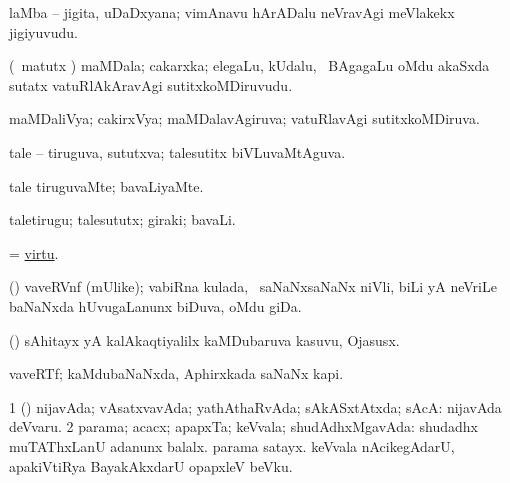 \bentry
{}
\gl{\nA}
\expl{}
\bmng
 laMba -- jigita, uDaDxyana; vimAnavu hArADalu neVravAgi meVlakekx jigiyuvudu. 
\emng
\eentry

\bentry
{} 
\gl{\nA}
\bmng
 (\pArxvi\ matutx \savi) maMDala; cakarxka; elegaLu, kUdalu, \mo\ BAgagaLu oMdu akaSxda sutatx vatuRlAkAravAgi sutitxkoMDiruvudu.  
\emng
\eentry

\bentry
{} 
\gl{\gu}
\expl{}
\bmng
 maMDaliVya; cakirxVya; maMDalavAgiruva; vatuRlavAgi sutitxkoMDiruva. 
\emng
\eentry

\bentry
{} 
\gl{\gu}
\expl{}
\bmng
 tale -- tiruguva, sututxva; talesutitx biVLuvaMtAguva. 
\emng
\eentry

\bentry
{} 
\gl{\kirxvi}
\expl{}
\bmng
 tale tiruguvaMte; bavaLiyaMte. 
\emng
\eentry

\bentry
{} 
\gl{\nA}
\bmng
 taletirugu; talesututx; giraki; bavaLi. 
\emng
\eentry

\bentry
{} 
\gl{\nA}
\expl{}
\bmng
 = \hyperlink{virtu}{virtu}. 
\emng
\eentry

\bentry
{} 
\gl{\nA}
\expl{}
\bmng
 (\savi) vaveRVnf (mUlike); vabiRna kulada, \kanmu\ saNaNxsaNaNx niVli, biLi yA neVriLe baNaNxda hUvugaLanunx biDuva, oMdu giDa. 
\emng
\eentry

\bentry
{} 
\gl{\nA}
\expl{}
\bmng
 (\kanmu) sAhitayx yA kalAkaqtiyalilx kaMDubaruva kasuvu, Ojasusx. 
\emng
\eentry

\bentry
{} 
\gl{\nA}
\expl{}
\bmng
 vaveRTf; kaMdubaNaNxda, Aphirxkada saNaNx kapi. 
\emng
\eentry

\bentry
{} 
\gl{\gu}
\expl{}
\bmng
\bnum
\num{1} (\pArxparx) nijavAda; vAsatxvavAda; yathAthaRvAda; sAkASxtAtxda; sAcA:  nijavAda deVvaru. 
\num{2} parama; acacx; apapxTa; keVvala; shudAdhxMgavAda:  shudadhx muTAThxLanU adanunx balalx.  parama satayx.  keVvala nAcikegAdarU, apakiVtiRya BayakAkxdarU opapxleV beVku. 
\enum
\emng

